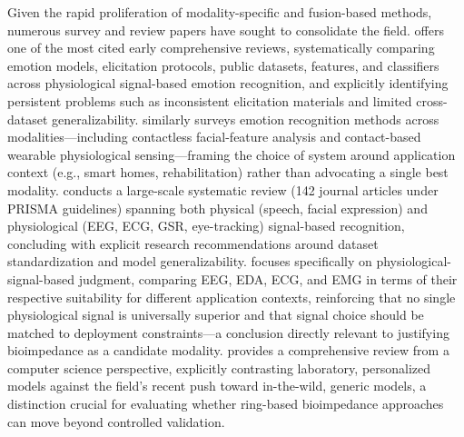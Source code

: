 Given the rapid proliferation of modality-specific and fusion-based methods, numerous survey and review papers have sought to consolidate the field. \cite{shu2018review} offers one of the most cited early comprehensive reviews, systematically comparing emotion models, elicitation protocols, public datasets, features, and classifiers across physiological signal-based emotion recognition, and explicitly identifying persistent problems such as inconsistent elicitation materials and limited cross-dataset generalizability. \cite{egger2019emotion} similarly surveys emotion recognition methods across modalities---including contactless facial-feature analysis and contact-based wearable physiological sensing---framing the choice of system around application context (e.g., smart homes, rehabilitation) rather than advocating a single best modality. \cite{khare2023emotion} conducts a large-scale systematic review (142 journal articles under PRISMA guidelines) spanning both physical (speech, facial expression) and physiological (EEG, ECG, GSR, eye-tracking) signal-based recognition, concluding with explicit research recommendations around dataset standardization and model generalizability. \cite{lin2023review} focuses specifically on physiological-signal-based judgment, comparing EEG, EDA, ECG, and EMG in terms of their respective suitability for different application contexts, reinforcing that no single physiological signal is universally superior and that signal choice should be matched to deployment constraints---a conclusion directly relevant to justifying bioimpedance as a candidate modality. \cite{younis2024machine} provides a comprehensive review from a computer science perspective, explicitly contrasting laboratory, personalized models against the field's recent push toward in-the-wild, generic models, a distinction crucial for evaluating whether ring-based bioimpedance approaches can move beyond controlled validation.

